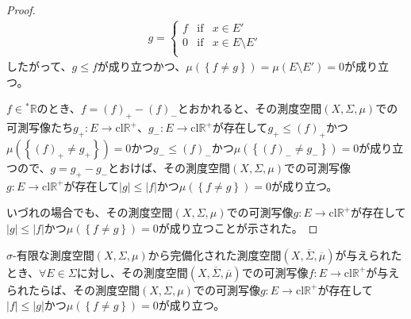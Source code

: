 \documentclass[dvipdfmx]{jsarticle}
\begin{document}
\begin{proof}
\begin{align*}
g = \left\{ \begin{matrix}
f & \mathrm{if} & x \in E' \\
0 & \mathrm{if} & x \in E \setminus E' \\
\end{matrix} \right.\ 
\end{align*}
したがって、$g \leq f$が成り立つかつ、$\mu\left( \left\{ f \neq g \right\} \right) = \mu\left( E \setminus E' \right) = 0$が成り立つ。\par
$f \in{}^{*}\mathbb{R}$のとき、$f = (f)_{+} - (f)_{-}$とおかれると、その測度空間$(X,\varSigma,\mu)$での可測写像たち$g_{+}:E \rightarrow \mathrm{cl}\mathbb{R}^{+}$、$g_{-}:E \rightarrow \mathrm{cl}\mathbb{R}^{+}$が存在して$g_{+} \leq (f)_{+}$かつ$\mu\left( \left\{ (f)_{+} \neq g_{+} \right\} \right) = 0$かつ$g_{-} \leq (f)_{-}$かつ$\mu\left( \left\{ (f)_{-} \neq g_{-} \right\} \right) = 0$が成り立つので、$g = g_{+} - g_{-}$とおけば、その測度空間$(X,\varSigma,\mu)$での可測写像$g:E \rightarrow \mathrm{cl}\mathbb{R}^{+}$が存在して$|g| \leq |f|$かつ$\mu\left( \left\{ f \neq g \right\} \right) = 0$が成り立つ。\par
いづれの場合でも、その測度空間$(X,\varSigma,\mu)$での可測写像$g:E \rightarrow \mathrm{cl}\mathbb{R}^{+}$が存在して$|g| \leq |f|$かつ$\mu\left( \left\{ f \neq g \right\} \right) = 0$が成り立つことが示された。
\end{proof}
\begin{thm}\label{4.5.5.23}
$\sigma$-有限な測度空間$(X,\varSigma,\mu)$から完備化された測度空間$\left( X,\overline{\varSigma},\overline{\mu} \right)$が与えられたとき、$\forall E \in \varSigma$に対し、その測度空間$\left( X,\overline{\varSigma},\overline{\mu} \right)$での可測写像$f:E \rightarrow \mathrm{cl}\mathbb{R}^{+}$が与えられたらば、その測度空間$(X,\varSigma,\mu)$での可測写像$g:E \rightarrow \mathrm{cl}\mathbb{R}^{+}$が存在して$|f| \leq |g|$かつ$\mu\left( \left\{ f \neq g \right\} \right) = 0$が成り立つ。
\end{thm}
\end{document}

